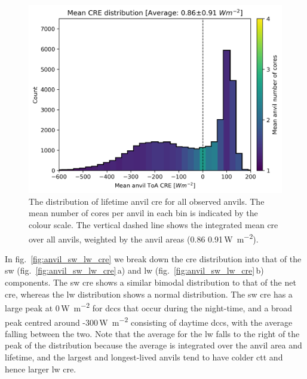 \begin{figure}[tp]
    \includegraphics[width=\textwidth]{figures/ch3_11.png}
    \caption[
    The distribution of lifetime anvil \acrshort{cre} for all observed anvils
    ]{
    The distribution of lifetime anvil \acrshort{cre} for all observed anvils. The mean number of cores per anvil in each bin is indicated by the colour scale. The vertical dashed line shows the integrated mean \acrshort{cre} over all anvils, weighted by the anvil areas (0.86\,\textpm\,0.91\,\unit{W m^{-2}}).
    }
    \label{fig:anvil_cre_dist}
\end{figure}


In fig.~\ref{fig:anvil_sw_lw_cre} we break down the \acrshort{cre} distribution into that of the \acrshort{sw} (fig.~\ref{fig:anvil_sw_lw_cre}\,a) and \acrshort{lw} (fig.~\ref{fig:anvil_sw_lw_cre}\,b) components. The \acrshort{sw} \acrshort{cre} shows a similar
bimodal distribution to that of the net \acrshort{cre}, whereas the \acrshort{lw} distribution
shows a normal distribution. The \acrshort{sw} \acrshort{cre} has a large peak at
0\,\unit{W m^{-2}} for \acrshort{dcc}s that occur during the night-time, and a
broad peak centred around -300\,\unit{W m^{-2}} consisting of
daytime \acrshort{dcc}s, with the average falling between the two. Note that the
average for the \acrshort{lw} falls to the right of the peak of the distribution
because the average is integrated over the anvil area and lifetime, and
the largest and longest-lived anvils tend to have colder \acrshort{ctt} and hence
larger \acrshort{lw} \acrshort{cre}.


